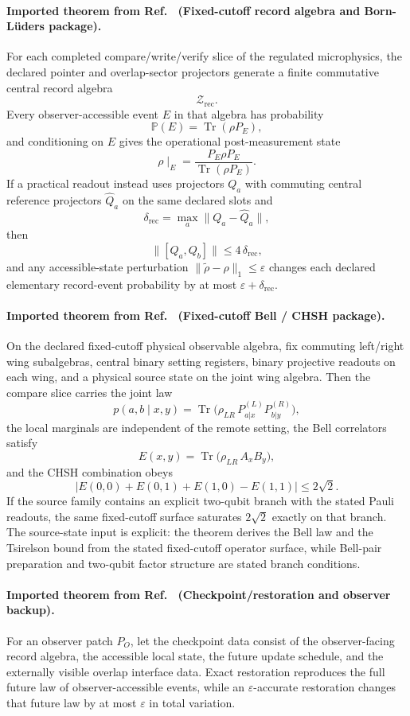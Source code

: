 \paragraph{Imported theorem from Ref.~\cite{ophmicrophysics} (Fixed-cutoff record algebra and Born-L\"uders package).}
For each completed compare/write/verify slice of the regulated microphysics, the declared pointer
and overlap-sector projectors generate a finite commutative central record algebra
\[
\mathcal Z_{\mathrm{rec}}.
\]
Every observer-accessible event \(E\) in that algebra has probability
\[
\mathbb P(E)=\operatorname{Tr}(\rho P_E),
\]
and conditioning on \(E\) gives the operational post-measurement state
\[
\rho\!\mid_E = \frac{P_E \rho P_E}{\operatorname{Tr}(\rho P_E)}.
\]
If a practical readout instead uses projectors \(Q_a\) with commuting central reference
projectors \(\widehat Q_a\) on the same declared slots and
\[
\delta_{\mathrm{rec}}=\max_a \|Q_a-\widehat Q_a\|,
\]
then
\[
\|[Q_a,Q_b]\|\le 4\,\delta_{\mathrm{rec}},
\]
and any accessible-state perturbation \(\|\widetilde\rho-\rho\|_1\le\varepsilon\) changes each
declared elementary record-event probability by at most \(\varepsilon+\delta_{\mathrm{rec}}\).

\paragraph{Imported theorem from Ref.~\cite{ophmicrophysics} (Fixed-cutoff Bell / CHSH package).}
On the declared fixed-cutoff physical observable algebra, fix commuting left/right wing
subalgebras, central binary setting registers, binary projective readouts on each wing, and a
physical source state on the joint wing algebra. Then the compare slice carries the joint law
\[
p(a,b\mid x,y)
=
\operatorname{Tr}\!\bigl(\rho_{LR}\,P_{a|x}^{(L)}P_{b|y}^{(R)}\bigr),
\]
the local marginals are independent of the remote setting, the Bell correlators satisfy
\[
E(x,y)=\operatorname{Tr}\!\bigl(\rho_{LR}\,A_xB_y\bigr),
\]
and the CHSH combination obeys
\[
\bigl|E(0,0)+E(0,1)+E(1,0)-E(1,1)\bigr|
\le
2\sqrt2.
\]
If the source family contains an explicit two-qubit branch with the stated Pauli readouts, the
same fixed-cutoff surface saturates \(2\sqrt2\) exactly on that branch. The source-state input
is explicit: the theorem derives the Bell law and the Tsirelson bound from the stated
fixed-cutoff operator surface, while Bell-pair preparation and two-qubit factor structure are
stated branch conditions.

\paragraph{Imported theorem from Ref.~\cite{ophmicrophysics} (Checkpoint/restoration and observer backup).}
For an observer patch \(P_O\), let the checkpoint data consist of the observer-facing record
algebra, the accessible local state, the future update schedule, and the externally visible
overlap interface data. Exact restoration reproduces the full future law of observer-accessible
events, while an \(\varepsilon\)-accurate restoration changes that future law by at most
\(\varepsilon\) in total variation.

